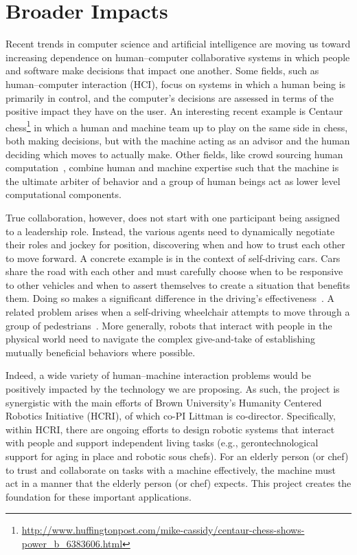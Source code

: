 
\section{Broader Impacts}

Recent trends in computer science and artificial intelligence are
moving us toward increasing dependence on human--computer
collaborative systems in which people and software make decisions that
impact one another.  Some fields, such as human--computer interaction
(HCI), focus on systems in which a human being is primarily in
control, and the computer's decisions are assessed in terms of the
positive impact they have on the user.  An interesting recent example
is Centaur
chess\footnote{\url{http://www.huffingtonpost.com/mike-cassidy/centaur-chess-shows-power_b_6383606.html}}
in which a human and machine team up to play on the same side in
chess, both making decisions, but with the machine acting as an
advisor and the human deciding which moves to actually make.  Other
fields, like crowd sourcing human computation~\cite{von2009human},
combine human and machine expertise such that the machine is the
ultimate arbiter of behavior and a group of human beings act as lower
level computational components.

True collaboration, however, does not start with one participant being
assigned to a leadership role.  Instead, the various agents need to
dynamically negotiate their roles and jockey for position, discovering
when and how to trust each other to move forward.  A concrete example
is in the context of self-driving cars.  Cars share the road with each
other and must carefully choose when to be responsive to other
vehicles and when to assert themselves to create a situation that
benefits them.  Doing so makes a significant difference in the
driving's effectiveness~\cite{cunningham2015mpdm}.  A related problem
arises when a self-driving wheelchair attempts to move through a group
of pedestrians~\cite{kim2016socially}.  More generally, robots that
interact with people in the physical world need to navigate the
complex give-and-take of establishing mutually beneficial behaviors
where possible.

Indeed, a wide variety of human--machine interaction problems would be
positively impacted by the technology we are proposing.
%
As such, the project is synergistic with the main efforts of Brown
University's Humanity Centered Robotics Initiative (HCRI), of which
co-PI Littman is co-director.  Specifically, within HCRI, there are
ongoing efforts to design robotic systems that interact with people
and support independent living tasks (e.g., gerontechnological support
for aging in place and robotic sous chefs).  For an elderly person (or
chef) to trust and collaborate on tasks with a machine effectively,
the machine must act in a manner that the elderly person (or chef)
expects.  This project creates the foundation for these important
applications.

